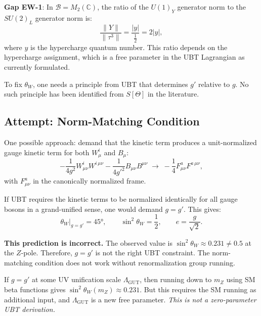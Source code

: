 \documentclass[12pt,a4paper]{article}
\theoremstyle{definition}
\theoremstyle{remark}
\begin{document}
\begin{gapbox}
\textbf{Gap EW-1}: In $\mathcal{B} = M_2(\mathbb{C})$, the ratio of the $U(1)_Y$
generator norm to the $SU(2)_L$ generator norm is:
\begin{equation}
  \frac{\|Y\|}{\|\tau^3\|} = \frac{|y|}{\tfrac{1}{2}}  = 2|y|,
  \label{eq:sb:normratio}
\end{equation}
where $y$ is the hypercharge quantum number.  This ratio depends on the
hypercharge assignment, which is a free parameter in the UBT Lagrangian as
currently formulated.

\medskip
To fix $\theta_W$, one needs a principle from UBT that determines $g'$ relative to $g$.
No such principle has been identified from $S[\Theta]$ in the literature.
\end{gapbox}

\subsection{Attempt: Norm-Matching Condition}

One possible approach: demand that the kinetic term produces a unit-normalized
gauge kinetic term for both $W^i_\mu$ and $B_\mu$:
\begin{equation}
  -\frac{1}{4g^2} W^i_{\mu\nu} W^{i\,\mu\nu}
  - \frac{1}{4{g'}^2} B_{\mu\nu} B^{\mu\nu}
  \;\longrightarrow\;
  -\frac{1}{4}F^a_{\mu\nu} F^{a\,\mu\nu},
\end{equation}
with $F^a_{\mu\nu}$ in the canonically normalized frame.

If UBT requires the kinetic terms to be normalized identically for all gauge
bosons in a grand-unified sense, one would demand $g = g'$.  This gives:
\begin{equation}
  \theta_W\big|_{g=g'} = 45°,
  \qquad
  \sin^2\theta_W = \frac{1}{2},
  \qquad
  e = \frac{g}{\sqrt{2}}.
  \label{eq:sb:unification}
\end{equation}

\begin{warnbox}
\textbf{This prediction is incorrect.}
The observed value is $\sin^2\theta_W \approx 0.231 \neq 0.5$ at the $Z$-pole.
Therefore, $g = g'$ is not the right UBT constraint.  The norm-matching condition
does not work without renormalization group running.

If $g = g'$ at some UV unification scale $\Lambda_{\mathrm{GUT}}$, then running
down to $m_Z$ using SM beta functions gives $\sin^2\theta_W(m_Z) \approx 0.231$.
But this requires the SM running as additional input, and $\Lambda_{\mathrm{GUT}}$
is a new free parameter.  \emph{This is not a zero-parameter UBT derivation.}
\end{warnbox}
\end{document}
